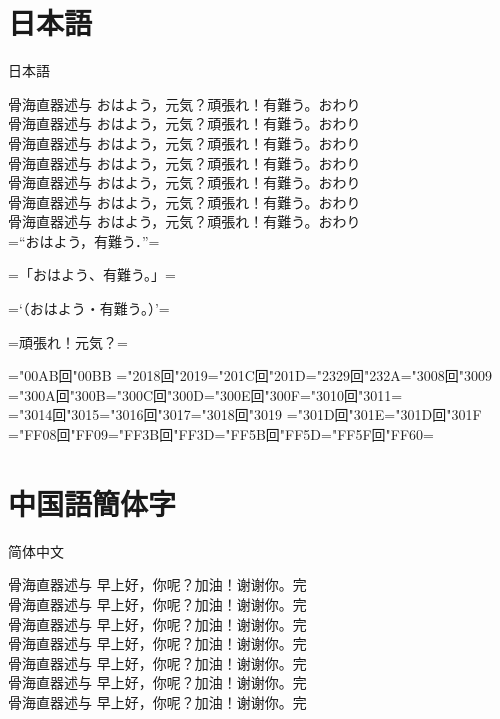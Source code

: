 \documentclass{ujarticle}
\begin{document}
\parindent0mm

\section{日本語}
\upjpngtb 日本語

\upjpnrml 骨海直器述与 おはよう，元気？頑張れ！有難う。おわり\\
\upjpnrmm 骨海直器述与 おはよう，元気？頑張れ！有難う。おわり\\
\upjpnrmb 骨海直器述与 おはよう，元気？頑張れ！有難う。おわり\\
\upjpngtm 骨海直器述与 おはよう，元気？頑張れ！有難う。おわり\\
\upjpngtb 骨海直器述与 おはよう，元気？頑張れ！有難う。おわり\\
\upjpngte 骨海直器述与 おはよう，元気？頑張れ！有難う。おわり\\
\upjpngth 骨海直器述与 おはよう，元気？頑張れ！有難う。おわり\\

\upjpnrmm
=“おはよう，有難う．”=

=「おはよう、有難う。」=

=‘（おはよう・有難う。）’=

=頑張れ！元気？=

=\kchar"00AB回\kchar"00BB%
=\kchar"2018回\kchar"2019=\kchar"201C回\kchar"201D=\kchar"2329回\kchar"232A=\kchar"3008回\kchar"3009%
=\kchar"300A回\kchar"300B=\kchar"300C回\kchar"300D=\kchar"300E回\kchar"300F=\kchar"3010回\kchar"3011=\\
=\kchar"3014回\kchar"3015=\kchar"3016回\kchar"3017=\kchar"3018回\kchar"3019%
=\kchar"301D回\kchar"301E=\kchar"301D回\kchar"301F%
=\kchar"FF08回\kchar"FF09=\kchar"FF3B回\kchar"FF3D=\kchar"FF5B回\kchar"FF5D=\kchar"FF5F回\kchar"FF60=


\section{中国語簡体字}
\upschgtb 简体中文

\upschrml 骨海直器述与 早上好，你呢？加油！谢谢你。完\\
\upschrmm 骨海直器述与 早上好，你呢？加油！谢谢你。完\\
\upschrmb 骨海直器述与 早上好，你呢？加油！谢谢你。完\\
\upschgtm 骨海直器述与 早上好，你呢？加油！谢谢你。完\\
\upschgtb 骨海直器述与 早上好，你呢？加油！谢谢你。完\\
\upschgte 骨海直器述与 早上好，你呢？加油！谢谢你。完\\
\upschgth 骨海直器述与 早上好，你呢？加油！谢谢你。完\\
\end{document}

